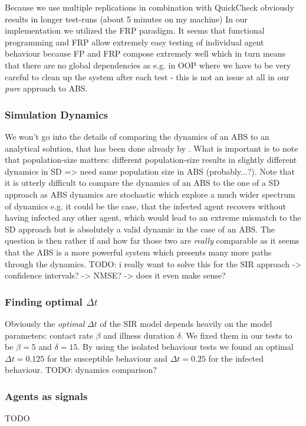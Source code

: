 Because we use multiple replications in combination with QuickCheck obviously results in longer test-runs (about 5 minutes on my machine)
In our implementation we utilized the FRP paradigm. It seems that functional programming and FRP allow extremely easy testing of individual agent behaviour because FP and FRP compose extremely well which in turn means that there are no global dependencies as e.g. in OOP where we have to be very careful to clean up the system after each test - this is not an issue at all in our \textit{pure} approach to ABS.

\subsubsection{Simulation Dynamics}
We won't go into the details of comparing the dynamics of an ABS to an analytical solution, that has been done already by \cite{macal_agent-based_2010}. What is important is to note that population-size matters: different population-size results in slightly different dynamics in SD => need same population size in ABS (probably...?). Note that it is utterly difficult to compare the dynamics of an ABS to the one of a SD approach as ABS dynamics are stochastic which explore a much wider spectrum of dynamics e.g. it could be the case, that the infected agent recovers without having infected any other agent, which would lead to an extreme mismatch to the SD approach but is absolutely a valid dynamic in the case of an ABS. The question is then rather if and how far those two are \textit{really} comparable as it seems that the ABS is a more powerful system which presents many more paths through the dynamics.
TODO: i really want to solve this for the SIR approach
	-> confidence intervals?
	-> NMSE?
	-> does it even make sense?

\subsubsection{Finding optimal $\Delta t$}
Obviously the \textit{optimal} $\Delta t$ of the SIR model depends heavily on the model parameters: contact rate $\beta$ and illness duration $\delta$. We fixed them in our tests to be $\beta = 5$ and $\delta = 15$. By using the isolated behaviour tests we found an optimal $\Delta t = 0.125$ for the susceptible behaviour and $\Delta t = 0.25$ for the infected behaviour. TODO: dynamics comparison?

\subsubsection{Agents as signals}
TODO

